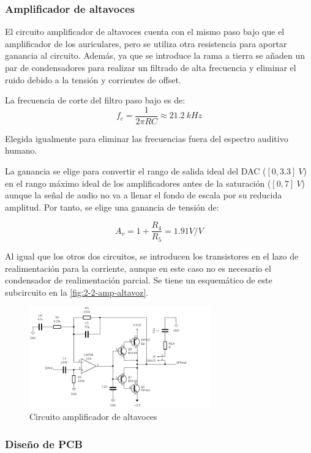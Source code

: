 \subsubsection{Amplificador de altavoces}

El circuito amplificador de altavoces cuenta con el mismo paso bajo que el amplificador de los auriculares, pero se utiliza otra resistencia para aportar ganancia al circuito. Además, ya que se introduce la rama a tierra se añaden un par de condensadores para realizar un filtrado de alta frecuencia y eliminar el ruido debido a la tensión y corrientes de offset.

La frecuencia de corte del filtro paso bajo es de:
\[
    f_c = \frac{1}{2\pi RC} \approx 21.2\ kHz
\]

Elegida igualmente para eliminar las frecuencias fuera del espectro auditivo humano.

La ganancia se elige para convertir el rango de salida ideal del DAC ($[0, 3.3]\ V$) en el rango máximo ideal de los amplificadores antes de la saturación ($[0, 7]\ V$) aunque la señal de audio no va a llenar el fondo de escala por su reducida amplitud. Por tanto, se elige una ganancia de tensión de:

\[
    A_v = 1 + \frac{R_4}{R_5} = 1.91 V/V
\]

Al igual que los otros dos circuitos, se introducen los transistores en el lazo de realimentación para la corriente, aunque en este caso no es necesario el condensador de realimentación parcial. Se tiene un esquemático de este subcircuito en la \autoref{fig:2-2-amp-altavoz}.

\begin{figure}[h]
    \centering
    \includegraphics[width=0.7\textwidth]{images/2/2-2/circuitoAmplificadorAltavoces.png}
    \caption{Circuito amplificador de altavoces}
    \label{fig:2-2-amp-altavoz}
\end{figure}

\subsubsection{Diseño de PCB}

